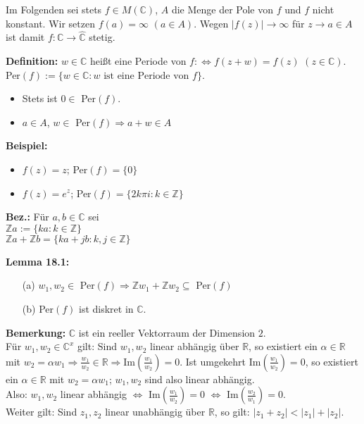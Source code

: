 \documentclass[11pt]{article}
\newcommand{\C}{\mathbb{C}}
\newcommand{\R}{\mathbb{R}}
\newcommand{\Z}{\mathbb{Z}}
\begin{document}
Im Folgenden sei stets $f \in M(\C)$, $A$ die Menge der Pole von $f$ und $f$ nicht konstant. Wir setzen $f(a) = \infty$ $(a \in A)$. Wegen $|f(z)| \to \infty$ für $z \to a \in A$ ist damit $f \colon \C \to \hat{\C}$ stetig.

\textbf{Definition:} $w \in \C$ heißt eine Periode von $f :\Leftrightarrow f(z+w) = f(z)$ $(z \in \C)$. \\
Per$(f) := \{ w \in \C \colon w \text{ ist eine Periode von } f \}$.
\vspace{-0.6cm}
\begin{itemize}
\item Stets ist $0 \in$ Per$(f)$. \vspace{-0.2cm}
\item $a \in A$, $w \in$ Per$(f) \Rightarrow a+w \in A$
\end{itemize}
\vspace{-0.3cm}

\textbf{Beispiel:}
\vspace{-0.6cm}
\begin{itemize}
\item $f(z) = z$; Per$(f) = \{ 0 \}$ \vspace{-0.2cm}
\item $f(z) = e^z$; Per$(f) = \{ 2k\pi i \colon k \in \Z \}$
\end{itemize}
\vspace{-0.3cm}

\textbf{Bez.:} Für $a,b \in \C$ sei \\
$\Z a := \{ ka \colon k \in \Z \}$ \\
$\Z a + \Z b = \{ ka + jb \colon k,j \in \Z \}$

\textbf{Lemma 18.1:} 
\vspace{-0.6cm}
\begin{itemize}
\item[(a)] $w_1, w_2 \in$ Per$(f) \Rightarrow \Z w_1 + \Z w_2 \subseteq$ Per$(f)$ \vspace{-0.2cm}
\item[(b)] Per$(f)$ ist diskret in $\C$. 
\end{itemize}
\vspace{-0.3cm}

\textbf{Bemerkung:} $\C$ ist ein reeller Vektorraum der Dimension $2$. \\
Für $w_1, w_2 \in \C^x$ gilt: Sind $w_1, w_2$ linear abhängig über $\R$, so existiert ein $\alpha \in \R$ mit $w_2 = \alpha w_1 \Rightarrow \frac{w_1}{w_2} \in \R \Rightarrow \text{Im}(\frac{w_1}{w_2}) = 0$. Ist umgekehrt Im$(\frac{w_1}{w_2}) = 0$, so existiert ein $\alpha \in \R$ mit $w_2 = \alpha w_1$; $w_1, w_2$ sind also linear abhängig. \\
Also: $w_1, w_2$ linear abhängig $\Leftrightarrow$ Im$(\frac{w_1}{w_2}) = 0$ $\Leftrightarrow$ Im$(\frac{w_2}{w_1}) = 0$. \\
Weiter gilt: Sind $z_1, z_2$ linear unabhängig über $\R$, so gilt: $|z_1 + z_2| < |z_1| + |z_2|$.
\end{document}

